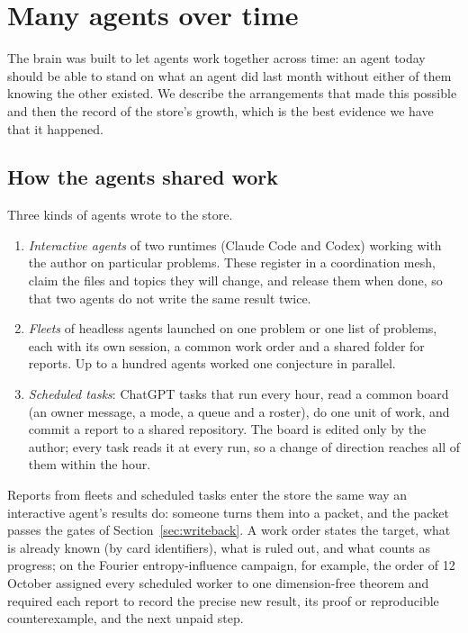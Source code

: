 \section{Many agents over time}\label{sec:collective}

The brain was built to let agents work together across time: an agent today should be able to stand on what an agent did last month without either of them knowing the other existed. We describe the arrangements that made this possible and then the record of the store's growth, which is the best evidence we have that it happened.

\subsection{How the agents shared work}
Three kinds of agents wrote to the store.
\begin{enumerate}[label=(\alph*)]
\item \emph{Interactive agents} of two runtimes (Claude Code and Codex) working with the author on particular problems. These register in a coordination mesh, claim the files and topics they will change, and release them when done, so that two agents do not write the same result twice.
\item \emph{Fleets} of headless agents launched on one problem or one list of problems, each with its own session, a common work order and a shared folder for reports. Up to a hundred agents worked one conjecture in parallel.
\item \emph{Scheduled tasks}: ChatGPT tasks that run every hour, read a common board (an owner message, a mode, a queue and a roster), do one unit of work, and commit a report to a shared repository. The board is edited only by the author; every task reads it at every run, so a change of direction reaches all of them within the hour.
\end{enumerate}
Reports from fleets and scheduled tasks enter the store the same way an interactive agent's results do: someone turns them into a packet, and the packet passes the gates of Section~\ref{sec:writeback}. A work order states the target, what is already known (by card identifiers), what is ruled out, and what counts as progress; on the Fourier entropy-influence campaign, for example, the order of 12 October assigned every scheduled worker to one dimension-free theorem and required each report to record the precise new result, its proof or reproducible counterexample, and the next unpaid step.

